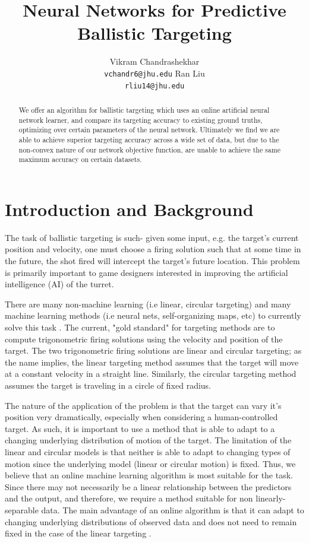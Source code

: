 \documentclass[11pt,letterpaper]{article}
\title{Neural Networks for Predictive Ballistic Targeting}
\author{Vikram Chandrashekhar\\
  {\tt vchandr6@jhu.edu}
  \And
  Ran Liu \\
  {\tt rliu14@jhu.edu}}
\date{}
\begin{document}
\maketitle

\begin{abstract}
 We offer an algorithm for ballistic targeting which uses an online artificial neural network learner, and compare its targeting accuracy to existing ground truths, optimizing over certain parameters of the neural network. Ultimately we find we are able to achieve superior targeting accuracy across a wide set of data, but due to the non-convex nature of our network objective function, are unable to achieve the same maximum accuracy on certain datasets.
\end{abstract}

\section{Introduction and Background}

The task of ballistic targeting is such- given some input, e.g. the target's current position and velocity, one must choose a firing solution such that at some time in the future, the shot fired will intercept the target's future location. This problem is primarily important to game designers interested in improving the artificial intelligence (AI) of the turret.

There are many non-machine learning (i.e linear, circular targeting) and many machine learning methods (i.e neural nets, self-organizing maps, etc) to currently solve this task \cite{Guesgen_anartificial}. The current, "gold standard" for targeting methods are to compute trigonometric firing solutions using the velocity and position of the target. The two trigonometric firing solutions are linear and circular targeting; as the name implies, the linear targeting method assumes that the target will move at a constant velocity in a straight line. Similarly, the circular targeting method assumes the target is traveling in a circle of fixed radius.

The nature of the application of the problem is that the target can vary it's position very dramatically, especially when considering a human-controlled target. As such, it is important to use a method that is able to adapt to a changing underlying distribution of motion of the target. The limitation of the linear and circular models is that neither is able to adapt to changing types of motion since the underlying model (linear or circular motion) is fixed. Thus, we believe that an online machine learning algorithm is most suitable for the task. Since there may not necessarily be a linear relationship between the predictors and the output, and therefore, we require a method suitable for non linearly-separable data. The main advantage of an online algorithm is that it can adapt to changing underlying distributions of observed data and does not need to remain fixed in the case of the linear targeting \cite{Bottou98onlinelearning}.
\end{document}

